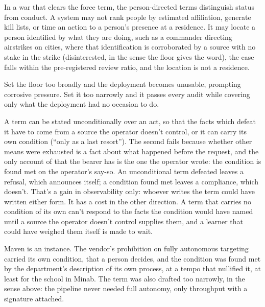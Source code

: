 In a war that clears the force term, the person-directed terms distinguish status from conduct. A system may not rank people by estimated affiliation, generate kill lists, or time an action to a person's presence at a residence. It may locate a person identified by what they are doing, such as a commander directing airstrikes on cities, where that identification is corroborated by a source with no stake in the strike (disinterested, in the sense the floor gives the word), the case falls within the pre-registered review ratio, and the location is not a residence.


Set the floor too broadly and the deployment becomes unusable, prompting corrosive pressure. Set it too narrowly and it passes every audit while covering only what the deployment had no occasion to do.


A term can be stated unconditionally over an act, so that the facts which defeat it have to come from a source the operator doesn't control, or it can carry its own condition (“only as a last resort”). The second fails because whether other means were exhausted is a fact about what happened before the request, and the only account of that the bearer has is the one the operator wrote: the condition is found met on the operator's say-so. An unconditional term defeated leaves a refusal, which announces itself; a condition found met leaves a compliance, which doesn't. That's a gain in observability only: whoever writes the term could have written either form. It has a cost in the other direction. A term that carries no condition of its own can't respond to the facts the condition would have named until a source the operator doesn't control supplies them, and a learner that could have weighed them itself is made to wait.

Maven is an instance. The vendor's prohibition on fully autonomous targeting carried its own condition, that a person decides, and the condition was found met by the department's description of its own process, at a tempo that nullified it, at least for the school in Minab. The term was also drafted too narrowly, in the sense above: the pipeline never needed full autonomy, only throughput with a signature attached.


